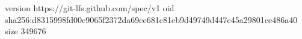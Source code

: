 version https://git-lfs.github.com/spec/v1
oid sha256:d8315998fd00c9065f2372da69cc681c81eb9d49749d447e45a29801ce486a40
size 349676
